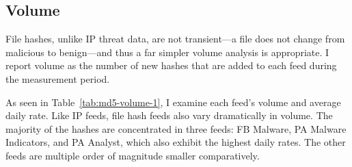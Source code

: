\subsection{Volume}

File hashes, unlike IP threat data, are not transient---a file does
not change from malicious to benign---and thus a far simpler volume
analysis is appropriate. I report volume as the number of new hashes
that are added to each feed during the measurement period.

As seen in Table~\ref{tab:md5-volume-1}, I examine each feed's volume and
average daily rate. Like IP feeds, file hash feeds also vary dramatically in
volume. The majority of the hashes are concentrated in three feeds: FB Malware,
PA Malware Indicators, and PA Analyst, which also exhibit the highest daily rates.
The other feeds are multiple order of magnitude smaller comparatively.

